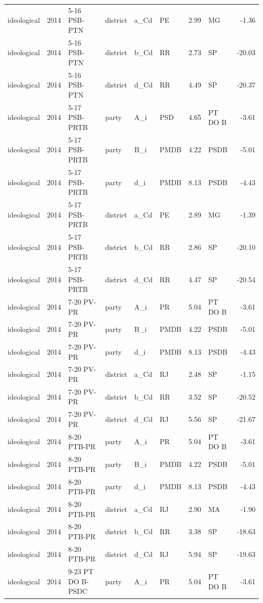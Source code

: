 \begin{landscape}
\begin{longtable}{lllL{2.2cm}lL{3.0cm}rL{3.0cm}r}
ideological & 2014 & 5-16 PSB-PTN & district & a\_Cd & PE & 2.99 & MG & -1.36 \\
ideological & 2014 & 5-16 PSB-PTN & district & b\_Cd & RR & 2.73 & SP & -20.03 \\
ideological & 2014 & 5-16 PSB-PTN & district & d\_Cd & RR & 4.49 & SP & -20.37 \\
ideological & 2014 & 5-17 PSB-PRTB & party & A\_i & PSD & 4.65 & PT DO B & -3.61 \\
ideological & 2014 & 5-17 PSB-PRTB & party & B\_i & PMDB & 4.22 & PSDB & -5.01 \\
ideological & 2014 & 5-17 PSB-PRTB & party & d\_i & PMDB & 8.13 & PSDB & -4.43 \\
ideological & 2014 & 5-17 PSB-PRTB & district & a\_Cd & PE & 2.89 & MG & -1.39 \\
ideological & 2014 & 5-17 PSB-PRTB & district & b\_Cd & RR & 2.86 & SP & -20.10 \\
ideological & 2014 & 5-17 PSB-PRTB & district & d\_Cd & RR & 4.47 & SP & -20.54 \\
ideological & 2014 & 7-20 PV-PR & party & A\_i & PR & 5.04 & PT DO B & -3.61 \\
ideological & 2014 & 7-20 PV-PR & party & B\_i & PMDB & 4.22 & PSDB & -5.01 \\
ideological & 2014 & 7-20 PV-PR & party & d\_i & PMDB & 8.13 & PSDB & -4.43 \\
ideological & 2014 & 7-20 PV-PR & district & a\_Cd & RJ & 2.48 & SP & -1.15 \\
ideological & 2014 & 7-20 PV-PR & district & b\_Cd & RR & 3.52 & SP & -20.52 \\
ideological & 2014 & 7-20 PV-PR & district & d\_Cd & RJ & 5.56 & SP & -21.67 \\
ideological & 2014 & 8-20 PTB-PR & party & A\_i & PR & 5.04 & PT DO B & -3.61 \\
ideological & 2014 & 8-20 PTB-PR & party & B\_i & PMDB & 4.22 & PSDB & -5.01 \\
ideological & 2014 & 8-20 PTB-PR & party & d\_i & PMDB & 8.13 & PSDB & -4.43 \\
ideological & 2014 & 8-20 PTB-PR & district & a\_Cd & RJ & 2.90 & MA & -1.90 \\
ideological & 2014 & 8-20 PTB-PR & district & b\_Cd & RR & 3.38 & SP & -18.63 \\
ideological & 2014 & 8-20 PTB-PR & district & d\_Cd & RJ & 5.94 & SP & -19.63 \\
ideological & 2014 & 9-23 PT DO B-PSDC & party & A\_i & PR & 5.04 & PT DO B & -3.61 \\

\end{longtable}
\end{landscape}
